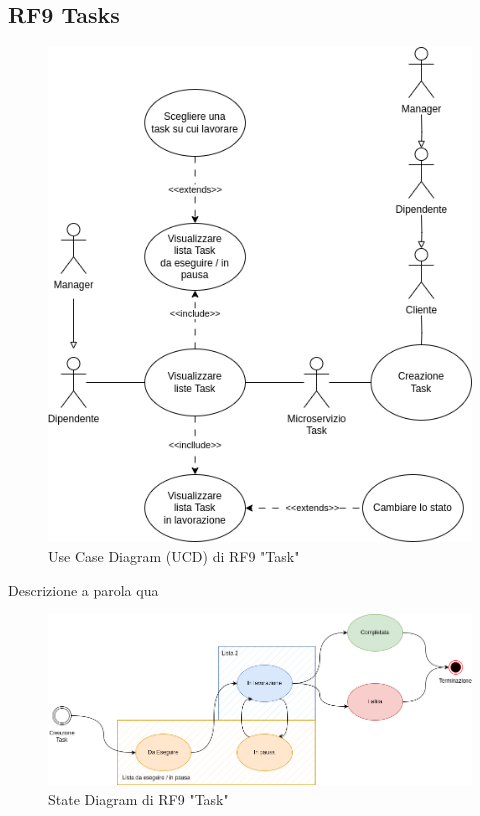 \documentclass{report}
\begin{document}
\subsection*{RF9 Tasks}

\begin{figure}[H]
	\centering\includegraphics[width=1\textwidth]{images/UCD/RF9_task_UCD.png}
	Use Case Diagram (UCD) di RF9 "Task"
\end{figure}

Descrizione a parola qua

\begin{figure}[H]
	\centering\includegraphics[width=1\textwidth]{images/state_diagram_task.png}
	State Diagram di RF9 "Task"
\end{figure}
\end{document}
